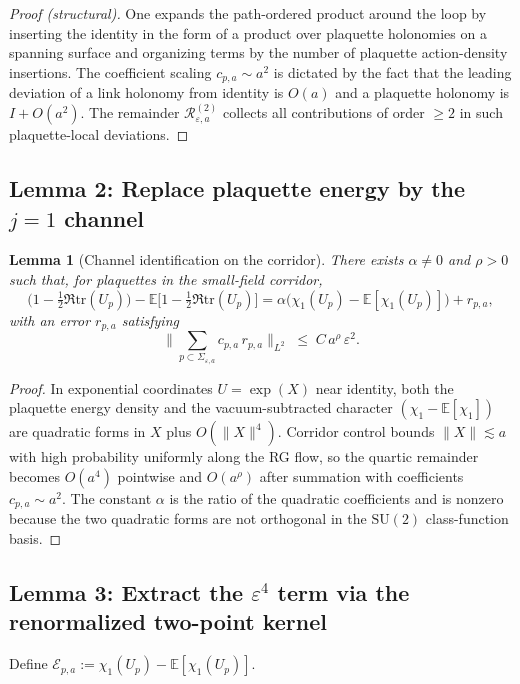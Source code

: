 \documentclass[11pt]{article}
\newtheorem{lemma}[theorem]{Lemma}
\theoremstyle{definition}
\newcommand{\E}{\mathbb{E}}
\newcommand{\SU}{\mathrm{SU}}
\newcommand{\tr}{\mathrm{tr}}
\newcommand{\1}{\mathbf{1}}
\begin{document}
\begin{proof}[Proof (structural)]
One expands the path-ordered product around the loop by inserting the identity in the form of a product over plaquette
holonomies on a spanning surface and organizing terms by the number of plaquette action-density insertions. The coefficient
scaling $c_{p,a}\sim a^2$ is dictated by the fact that the leading deviation of a link holonomy from identity is $O(a)$ and a
plaquette holonomy is $I+O(a^2)$. The remainder $\mathcal R^{(2)}_{\varepsilon,a}$ collects all contributions of order $\ge2$
in such plaquette-local deviations.
\end{proof}

\subsection{Lemma 2: Replace plaquette energy by the $j=1$ channel}
\begin{lemma}[Channel identification on the corridor]\label{lem:energy_to_chi}
There exists $\alpha\neq 0$ and $\rho>0$ such that, for plaquettes in the small-field corridor,
\begin{equation}\label{eq:energychi}
\Big(1-\tfrac12\Re\tr(U_p)\Big)-\E\Big[1-\tfrac12\Re\tr(U_p)\Big]
=
\alpha\Big(\chi_1(U_p)-\E[\chi_1(U_p)]\Big) + r_{p,a},
\end{equation}
with an error $r_{p,a}$ satisfying
\[
\Big\|\sum_{p\subset\Sigma_{\varepsilon,a}} c_{p,a}\,r_{p,a}\Big\|_{L^2}\;\le\; C\,a^\rho\,\varepsilon^2.
\]
\end{lemma}

\begin{proof}
In exponential coordinates $U=\exp(X)$ near identity, both the plaquette energy density and the vacuum-subtracted
character $(\chi_1-\E[\chi_1])$ are quadratic forms in $X$ plus $O(\|X\|^4)$. Corridor control bounds $\|X\|\lesssim a$
with high probability uniformly along the RG flow, so the quartic remainder becomes $O(a^4)$ pointwise and $O(a^\rho)$
after summation with coefficients $c_{p,a}\sim a^2$. The constant $\alpha$ is the ratio of the quadratic coefficients and
is nonzero because the two quadratic forms are not orthogonal in the $\SU(2)$ class-function basis.
\end{proof}

\subsection{Lemma 3: Extract the $\varepsilon^4$ term via the renormalized two-point kernel}
Define $\mathcal E_{p,a}:=\chi_1(U_p)-\E[\chi_1(U_p)]$.
\end{document}
